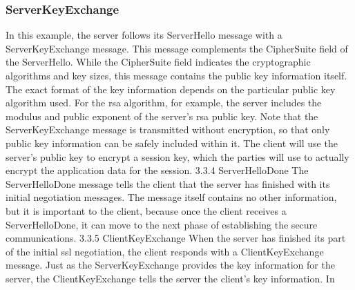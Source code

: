 \subsubsection{ServerKeyExchange}
In this example, the server follows its ServerHello message with a
ServerKeyExchange message. This message complements the CipherSuite field of the ServerHello. While the CipherSuite field indicates
the cryptographic algorithms and key sizes, this message contains the
public key information itself. The exact format of the key information depends on the particular public key algorithm used. For the rsa
algorithm, for example, the server includes the modulus and public
exponent of the server’s rsa public key.
Note that the ServerKeyExchange message is transmitted without
encryption, so that only public key information can be safely included within it. The client will use the server’s public key to encrypt
a session key, which the parties will use to actually encrypt the application data for the session.
3.3.4 ServerHelloDone
The ServerHelloDone message tells the client that the server has finished with its initial negotiation messages. The message itself contains no other information, but it is important to the client, because
once the client receives a ServerHelloDone, it can move to the next
phase of establishing the secure communications.
3.3.5 ClientKeyExchange
When the server has finished its part of the initial ssl negotiation,
the client responds with a ClientKeyExchange message. Just as the
ServerKeyExchange provides the key information for the server, the
ClientKeyExchange tells the server the client’s key information. In

